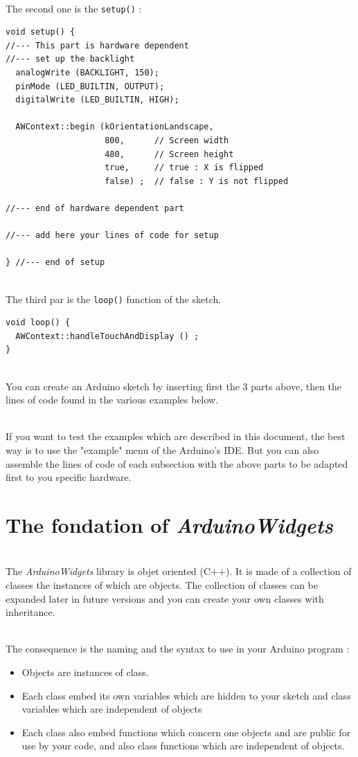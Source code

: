 \documentclass[a4paper,11pt]{extarticle}
\begin{document}
~\\The second one is  the \texttt{setup()} :
\begin{lstlisting}[language=Arduinonl]
void setup() {
//--- This part is hardware dependent
//--- set up the backlight
  analogWrite (BACKLIGHT, 150);
  pinMode (LED_BUILTIN, OUTPUT);
  digitalWrite (LED_BUILTIN, HIGH);

  AWContext::begin (kOrientationLandscape,
                    800,      // Screen width
                    480,      // Screen height
                    true,     // true : X is flipped
                    false) ;  // false : Y is not flipped

//--- end of hardware dependent part

//--- add here your lines of code for setup

} //--- end of setup
\end{lstlisting}

~\\The third par is the \texttt{loop()} function of the sketch.
 
\begin{lstlisting}[language=Arduinonl]
void loop() {
  AWContext::handleTouchAndDisplay () ;
}  
\end{lstlisting}
~\\You can create an Arduino sketch by inserting first the 3 parts above, then the lines of code found in the various examples below.
  
~\\If you want to test the examples which are described in this document, the best way is to use the "example" menu of the Arduino's IDE. But you can also assemble the lines of code of each subsection with the above parts to be adapted first to you specific hardware.
  
\newpage
\section{The fondation of \emph{ArduinoWidgets}}

~\\The \emph{ArduinoWidgets} library is objet oriented (C++). It is made of a collection of classes the instances of which are objects. The collection of classes can be expanded later in future versions and you can create your own classes with inheritance.

~\\The consequence is the naming and the syntax to use in your Arduino program : 
\begin{itemize}
\item Objects are instances of class.
\item Each class embed its own variables which are hidden to your sketch and class variables which are independent of objects
\item Each class also embed functions which concern one objects and are public for use by your code, and also class functions which are independent of objects.
\end{itemize}
\end{document}
